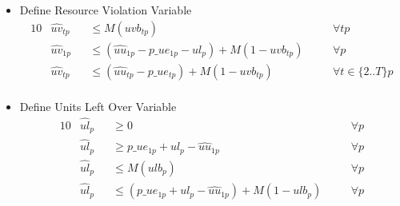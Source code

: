 \begin{itemize}
	
	\item Define Resource Violation Variable
	\begin{alignat}{10}
		& \hat{uv}_{tp} 
		&& \le  M(uvb_{tp}) \quad
		&& \forall tp \\
		& \hat{uv}_{1p} 
		&& \le  (\hat{uu}_{1p} - p\_ue_{1p} - ul_{p}) + M(1-uvb_{tp}) \quad
		&& \forall p \\
		& \hat{uv}_{tp} 
		&& \le  (\hat{uu}_{tp} - p\_ue_{tp}) + M(1-uvb_{tp}) \quad
		&& \forall t \in \{ 2..T \} p \\
	\end{alignat}
	
	\item Define Units Left Over Variable
	\begin{alignat}{10}
		& \hat{ul}_{p} 
		&& \ge 0 \quad 
		&& \forall p \\
		& \hat{ul}_{p} 
		&& \ge p\_ue_{1p} + ul_{p} - \hat{uu}_{1p} \quad 
		&& \forall p \\
		& \hat{ul}_{p} 
		&& \le M (ulb_{p}) \quad 
		&& \forall p \\
		& \hat{ul}_{p} 
		&& \le (p\_ue_{1p} + ul_{p} - \hat{uu}_{1p}) + M(1-ulb_{p}) \quad 
		&& \forall p 
	\end{alignat}
\end{itemize}

